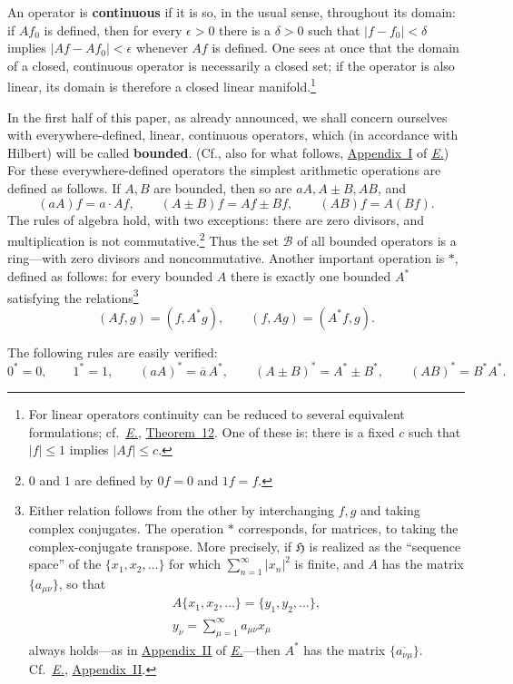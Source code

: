 \documentclass[
  paper=b5,
  twoside=true,
  fontsize=13pt,
  headings=normal,
  bookmarkpackage=false
]{scrartcl}
\theoremstyle{definition}
\newcommand{\Eref}{\hyperref[fn:E-paper]{\emph{E.}}}
\newcommand{\ErefText}[1]{\href{https://doi.org/10.1007/BF01782338}{#1}}
\begin{document}
An operator is \textbf{continuous} if it is so, in the usual sense,
throughout its domain: if $Af_0$ is defined, then for every $\epsilon>0$ there
is a $\delta>0$ such that $|f-f_0|<\delta$ implies $|Af-Af_0|<\epsilon$
whenever $Af$ is defined. One sees at once that the domain of a closed,
continuous operator is necessarily a closed set; if the operator is also
linear, its domain is therefore a closed linear
manifold.\footnote{\label{fn:10}For linear operators continuity can be reduced to
several equivalent formulations; cf.\ \Eref, \ErefText{Theorem~12}. One of these is:
there is a fixed $c$ such that $|f|\leq 1$ implies $|Af|\leq c$.}

In the first half of this paper, as already announced, we shall concern
ourselves with everywhere-defined, linear, continuous operators, which (in
accordance with Hilbert) will be called \textbf{bounded}. (Cf., also for what follows,
\ErefText{Appendix~I} of \Eref) For these everywhere-defined operators the simplest
arithmetic operations are defined as follows. If $A,B$ are bounded, then so
are $aA,A\pm B,AB$, and
\[
  (aA)f=a\cdot Af,\qquad
  (A\pm B)f=Af\pm Bf,\qquad
  (AB)f=A(Bf).
\]
The rules of algebra hold, with two exceptions: there are zero divisors,
and multiplication is not commutative.\footnote{\label{fn:11}$0$ and $1$ are defined by
$0f=0$ and $1f=f$.} Thus the set $\mathcal B$ of all bounded operators is
a ring---with zero divisors and noncommutative. Another important operation
is $*$, defined as follows: for every bounded $A$ there is exactly one
bounded $A^*$ satisfying the relations\footnote{\label{fn:12}Either relation follows from the other by interchanging $f,g$
and taking complex conjugates. The operation $*$ corresponds, for
matrices, to taking the complex-conjugate transpose. More precisely, if
$\mathfrak H$ is realized as the ``sequence space'' of the
$\{x_1,x_2,\ldots\}$ for which $\sum_{n=1}^{\infty}|x_n|^2$ is finite, and
$A$ has the matrix $\{a_{\mu\nu}\}$, so that
\[
\begin{gathered}
  A\{x_1,x_2,\ldots\}=\{y_1,y_2,\ldots\},\\
  y_\nu=\sum_{\mu=1}^{\infty}a_{\mu\nu}x_\mu
\end{gathered}
\]
always holds---as in \ErefText{Appendix~II} of \Eref{}---then $A^*$ has the matrix
$\{\overline{a_{\nu\mu}}\}$. Cf.\ \Eref, \ErefText{Appendix~II}.}
\[
  (Af,g)=(f,A^*g),\qquad (f,Ag)=(A^*f,g).
\]

The following rules are easily verified:
\[
  0^*=0,\qquad 1^*=1,\qquad
  (aA)^*=\overline a\,A^*,\qquad
  (A\pm B)^*=A^*\pm B^*,\qquad
  (AB)^*=B^*A^*.
\]
\end{document}
